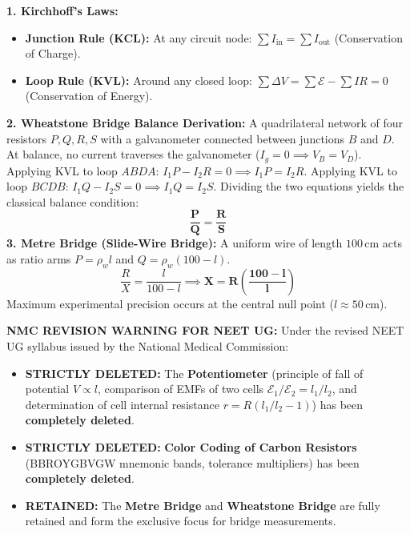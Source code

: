 \documentclass[10pt,twoside,openright]{book}
\begin{document}
\begin{formulabox}
\textbf{1. Kirchhoff's Laws:}
\begin{itemize}
  \item \textbf{Junction Rule (KCL):} At any circuit node: $\sum I_{\text{in}} = \sum I_{\text{out}}$ (Conservation of Charge).
  \item \textbf{Loop Rule (KVL):} Around any closed loop: $\sum \Delta V = \sum \mathcal{E} - \sum I R = 0$ (Conservation of Energy).
\end{itemize}
\textbf{2. Wheatstone Bridge Balance Derivation:}
A quadrilateral network of four resistors $P, Q, R, S$ with a galvanometer connected between junctions $B$ and $D$.
At balance, no current traverses the galvanometer ($I_g = 0 \implies V_B = V_D$).
Applying KVL to loop $ABDA$: $I_1 P - I_2 R = 0 \implies I_1 P = I_2 R$.
Applying KVL to loop $BCDB$: $I_1 Q - I_2 S = 0 \implies I_1 Q = I_2 S$.
Dividing the two equations yields the classical balance condition:
\begin{equation}
  \mathbf{\frac{P}{Q} = \frac{R}{S}}
\end{equation}
\textbf{3. Metre Bridge (Slide-Wire Bridge):}
A uniform wire of length $100\,\mathrm{cm}$ acts as ratio arms $P = \rho_w l$ and $Q = \rho_w (100 - l)$.
\begin{equation}
  \frac{R}{X} = \frac{l}{100 - l} \implies \mathbf{X = R \left(\frac{100 - l}{l}\right)}
\end{equation}
Maximum experimental precision occurs at the central null point ($l \approx 50\,\mathrm{cm}$).
\end{formulabox}

\begin{trapbox}
\textbf{NMC REVISION WARNING FOR NEET UG:}
Under the revised NEET UG syllabus issued by the National Medical Commission:
\begin{itemize}
  \item \textbf{STRICTLY DELETED:} The \textbf{Potentiometer} (principle of fall of potential $V \propto l$, comparison of EMFs of two cells $\mathcal{E}_1/\mathcal{E}_2 = l_1/l_2$, and determination of cell internal resistance $r = R(l_1/l_2 - 1)$) has been \textbf{completely deleted}.
  \item \textbf{STRICTLY DELETED:} \textbf{Color Coding of Carbon Resistors} (BBROYGBVGW mnemonic bands, tolerance multipliers) has been \textbf{completely deleted}.
  \item \textbf{RETAINED:} The \textbf{Metre Bridge} and \textbf{Wheatstone Bridge} are fully retained and form the exclusive focus for bridge measurements.
\end{itemize}
\end{trapbox}
\end{document}
